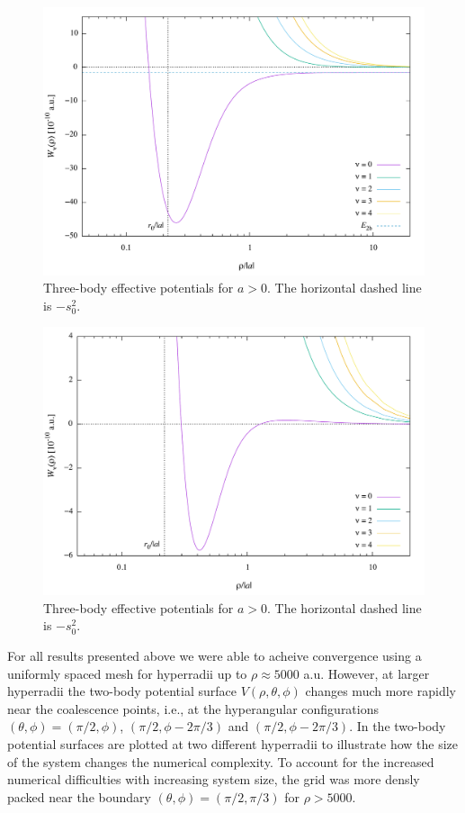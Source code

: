 \begin{figure}
	\includegraphics[width=\linewidth]{Wpos2.pdf}
	\caption{Three-body effective potentials for $a>0$. The horizontal dashed line is $-s_0^2$.}
	\label{fig:Wpos}
\end{figure}

\begin{figure}
	\includegraphics[width=\linewidth]{Wneg2.pdf}
	\caption{Three-body effective potentials for $a>0$. The horizontal dashed line is $-s_0^2$.}
	\label{fig:Wneg}
\end{figure}

For all results presented above we were able to acheive convergence using a uniformly spaced mesh for hyperradii up to $\rho \approx 5000$ a.u. However, at larger hyperradii the two-body potential surface $V(\rho,\theta,\phi)$ changes much more rapidly near the coalescence points, i.e., at the hyperangular configurations $(\theta,\phi) = (\pi/2,\phi)$, $(\pi/2,\phi - 2\pi/3)$ and $(\pi/2,\phi - 2\pi/3)$. In  the two-body potential surfaces are plotted at two different hyperradii to illustrate how the size of the system changes the numerical complexity. To account for the increased numerical difficulties with increasing system size, the grid was more densly packed near the boundary $(\theta,\phi)=(\pi/2,\pi/3)$ for $\rho > 5000$. 


